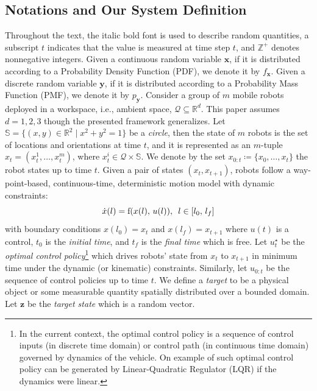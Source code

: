 \documentclass[letterpaper, 10 pt, conference]{ieeeconf}
\begin{document}
\subsection{Notations and Our System Definition}
Throughout the text, the italic bold font is used to describe random quantities, a subscript $t$ indicates that the value is measured at time step $t$, and $\mathbb{Z}^{+}$ denotes nonnegative integers. %
Given a continuous random variable $\bm{x}$, if it is distributed according to a Probability Density Function (PDF), we denote it by $f_{\bm{x}}$.
Given a discrete random variable $\bm{y}$, if it is distributed according to a Probability Mass Function (PMF), we denote it by $p_{\bm{y}}$.
Consider a group of $m$ mobile robots deployed in a workspace, i.e., ambient space, $\mathcal{Q} \subseteq \mathbb{R}^d$. 
This paper assumes $d=1,2,3$ though the presented framework generalizes. 
Let $\mathbb{S} = \lbrace (x,y)\in \mathbb{R}^2\mid x^2+y^2=1 \rbrace$ be a \emph{circle}, then the state of $m$ robots is the set of locations and orientations at time $t$, and it is represented as an $m$-tuple $x_t = (x_t^1,\dots,x_t^m)$, where $x_t^i \in \mathcal{Q} \times \mathbb{S}$. We denote by the set ${x}_{0:t}\coloneqq \lbrace {x}_0,\dots,{x}_t \rbrace$ the robot states up to time $t$. 
Given a pair of states $(x_t,x_{t+1})$, robots follow a way-point-based, continuous-time, deterministic motion model with dynamic constraints:
\begin{equation}
\dot{x}(l) = \textup{f}(x(l),\,u(l)), \,\,\, l \in [l_0,\,l_f]
\label{eq:constraint}
\end{equation}
with boundary conditions $x(l_0) = x_t$ and $x(l_f) = x_{t+1}$ where $u(t)$ is a control, $t_0$ is the \emph{initial time}, and $t_f$ is the \emph{final time} which is free. 
Let $u_t^{\star}$ be the \emph{optimal control policy}\footnote{In the current context, the optimal control policy is a sequence of control inputs (in discrete time domain) or control path (in continuous time domain) governed by dynamics of the vehicle. On example of such optimal control policy can be generated by Linear-Quadratic Regulator (LQR) if the dynamics were linear.} which drives robots' state from $x_t$ to $x_{t+1}$ in minimum time under the dynamic (or kinematic) constraints. Similarly, let $u_{0:t}$ be the sequence of control policies up to time $t$.
We define a \emph{target} to be a physical object or some measurable quantity spatially distributed over a bounded domain.
Let $\bm{z}$ be the \emph{target state} which is a random vector. 
\end{document}
